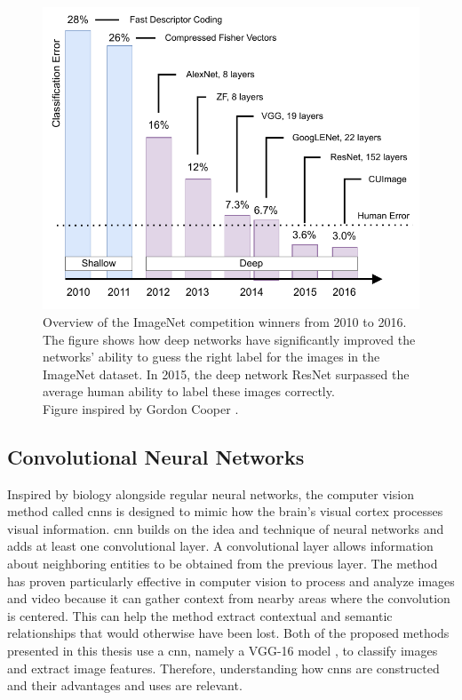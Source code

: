     \begin{figure}[htb]
        \centering
        \includegraphics[width=\linewidth]{images/imagenet_results_graph}
        \caption[ImageNet competition winners from 2010 to 2016.]{Overview of the ImageNet competition winners from 2010 to 2016. The figure shows how deep networks have significantly improved the networks' ability to guess the right label for the images in the ImageNet dataset. In 2015, the deep network ResNet \cite{heDeepResidualLearning2015} surpassed the average human ability to label these images correctly. \\
        Figure inspired by Gordon Cooper \cite{cooperSoftwareFrameworkRequirements2017}.}
        \label{fig:imagenet_results_graph}
    \end{figure}


    
    \subsection{Convolutional Neural Networks}

    Inspired by biology alongside regular neural networks, the computer vision method called \glspl{cnn} is designed to mimic how the brain's visual cortex processes visual information. \gls{cnn} builds on the idea and technique of neural networks and adds at least one convolutional layer. A convolutional layer allows information about neighboring entities to be obtained from the previous layer. The method has proven particularly effective in computer vision to process and analyze images and video because it can gather context from nearby areas where the convolution is centered. This can help the method extract contextual and semantic relationships that would otherwise have been lost. Both of the proposed methods presented in this thesis use a \gls{cnn}, namely a VGG-16 model \cite{simonyanVeryDeepConvolutional2015}, to classify images and extract image features. Therefore, understanding how \glspl{cnn} are constructed and their advantages and uses are relevant.

